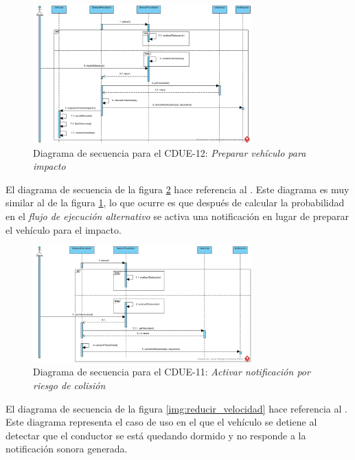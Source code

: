 \begin{figure}[h]
  \begin{center}
    \includegraphics[width=0.75\textwidth]{./img/diagramas_de_secuencia/CDUE-12.png}
  \end{center}
  \caption{Diagrama de secuencia para el CDUE-12: \textit{Preparar vehículo para impacto}}
  \label{img:prep_vehiculo_impacto}
\end{figure}

\par El diagrama de secuencia de la figura \ref{img:not_riesgo_colision} hace referencia al . Este diagrama es muy similar al de la figura \ref{img:prep_vehiculo_impacto}, lo que ocurre es que después de calcular la probabilidad en el \textit{flujo de ejecución alternativo} se activa una notificación en lugar de preparar el vehículo para el impacto.

\begin{figure}[h]
  \begin{center}
    \includegraphics[width=0.75\textwidth]{./img/diagramas_de_secuencia/CDUE-11.png}
  \end{center}
  \caption{Diagrama de secuencia para el CDUE-11: \textit{Activar notificación por riesgo de colisión}}
  \label{img:not_riesgo_colision}
\end{figure}

\par El diagrama de secuencia de la figura \ref{img:reducir_velocidad} hace referencia al . Este diagrama representa el caso de uso en el que el vehículo se detiene al detectar que el conductor se está quedando dormido y no responde a la notificación sonora generada.


